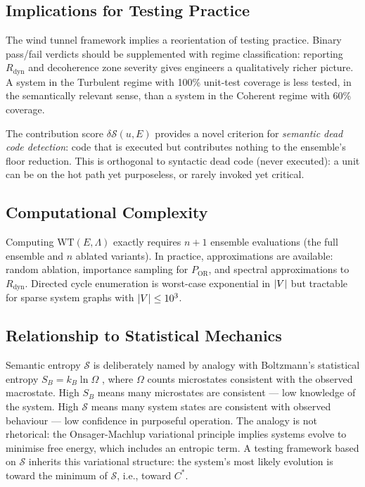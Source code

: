 \documentclass[twocolumn,a4paper,11pt]{article}
\theoremstyle{plain}
\theoremstyle{definition}
\theoremstyle{remark}
\DeclareMathOperator{\OR}{OR}
\DeclarePairedDelimiter{\abs}{\lvert}{\rvert}
\begin{document}
\subsection{Implications for Testing Practice}

The wind tunnel framework implies a reorientation of testing practice.
Binary pass/fail verdicts should be supplemented with regime
classification: reporting $R_\mathrm{dyn}$ and decoherence zone severity
gives engineers a qualitatively richer picture. A system in the Turbulent
regime with 100\% unit-test coverage is less tested, in the semantically
relevant sense, than a system in the Coherent regime with 60\% coverage.

The contribution score $\delta\mathcal{S}(u, E)$ provides a novel
criterion for \emph{semantic dead code detection}: code that is executed
but contributes nothing to the ensemble's floor reduction. This is
orthogonal to syntactic dead code (never executed): a unit can be on the
hot path yet purposeless, or rarely invoked yet critical.

\subsection{Computational Complexity}

Computing $\mathrm{WT}(E, \Lambda)$ exactly requires $n+1$ ensemble
evaluations (the full ensemble and $n$ ablated variants). In practice,
approximations are available: random ablation, importance sampling for
$P_\OR$, and spectral approximations to $R_\mathrm{dyn}$. Directed cycle
enumeration is worst-case exponential in $\abs{V}$ but tractable for
sparse system graphs with $\abs{V} \leq 10^3$.

\subsection{Relationship to Statistical Mechanics}

Semantic entropy $\mathcal{S}$ is deliberately named by analogy with
Boltzmann's statistical entropy $S_B = k_B \ln \Omega$ \cite{boltzmann1877},
where $\Omega$ counts microstates consistent with the observed macrostate.
High $S_B$ means many microstates are consistent --- low knowledge of the
system. High $\mathcal{S}$ means many system states are consistent with
observed behaviour --- low confidence in purposeful operation. The analogy
is not rhetorical: the Onsager-Machlup variational principle
\cite{onsager1953} implies systems evolve to minimise free energy, which
includes an entropic term. A testing framework based on $\mathcal{S}$
inherits this variational structure: the system's most likely evolution
is toward the minimum of $\mathcal{S}$, i.e., toward $C^*$.
\end{document}
